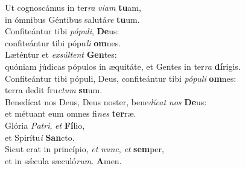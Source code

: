\evenverse Ut cognoscámus in ter\textit{ra} \textit{vi}\textit{am} \textbf{tu}am,~\*\\
\evenverse in ómnibus Géntibus salutá\textit{re} \textbf{tu}um.\\
\oddverse Confiteántur tibi \textit{pó}\textit{pu}\textit{li}, \textbf{De}us:~\*\\
\oddverse confiteántur tibi pópu\textit{li} \textbf{om}nes.\\
\evenverse Læténtur et \textit{ex}\textit{súl}\textit{tent} \textbf{Gen}tes:~\*\\
\evenverse quóniam júdicas pópulos in æquitáte, et Gentes in ter\textit{ra} \textbf{dí}rigis.\\
\oddverse Confiteántur tibi pópuli, Deus, confiteántur tibi \textit{pó}\textit{pu}\textit{li} \textbf{om}nes:~\*\\
\oddverse terra dedit fru\textit{ctum} \textbf{su}um.\\
\evenverse Benedícat nos Deus, Deus noster, bene\textit{dí}\textit{cat} \textit{nos} \textbf{De}us:~\*\\
\evenverse et métuant eum omnes fi\textit{nes} \textbf{ter}ræ.\\
\oddverse Glória \textit{Pa}\textit{tri}, \textit{et} \textbf{Fí}lio,~\*\\
\oddverse et Spirítu\textit{i} \textbf{San}cto.\\
\evenverse Sicut erat in princípio, \textit{et} \textit{nunc}, \textit{et} \textbf{sem}per,~\*\\
\evenverse et in sǽcula sæculó\textit{rum}. \textbf{A}men.\\
